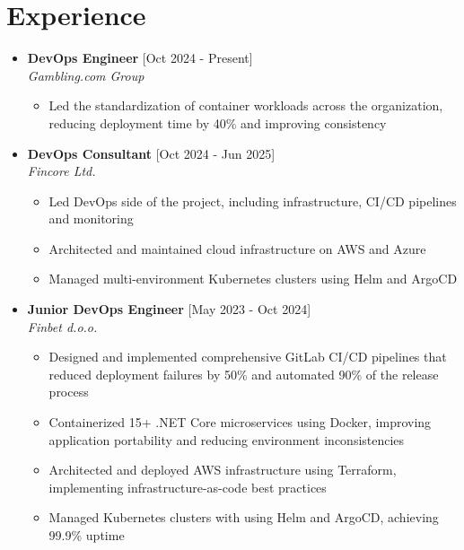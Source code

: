 \documentclass[12pt,a4paper]{moderncv}
\begin{document}
\makecvtitle

\vspace{-0.5em}
\section{Experience}

\begin{itemize}
	\item \textbf{DevOps Engineer} \hfill [Oct 2024 - Present]\\
	\textit{Gambling.com Group}

	\begin{itemize}
		\vspace{-0.75em}
		\setlength\itemsep{0.1em}
		\item Led the standardization of container workloads across the organization, reducing deployment time by 40\% and improving consistency
	\end{itemize}

	\item \textbf{DevOps Consultant} \hfill [Oct 2024 - Jun 2025]\\
	\textit{Fincore Ltd.}

	\begin{itemize}
		\vspace{-0.75em}
		\setlength\itemsep{0.1em}
		\item Led DevOps side of the project, including infrastructure, CI/CD pipelines and monitoring
		\item Architected and maintained cloud infrastructure on AWS and Azure
		\item Managed multi-environment Kubernetes clusters using Helm and ArgoCD
	\end{itemize}

	\item \textbf{Junior DevOps Engineer} \hfill [May 2023 - Oct 2024]\\
	\textit{Finbet d.o.o.}

	\begin{itemize}
		\vspace{-0.75em}
		\setlength\itemsep{0.1em}
		\item Designed and implemented comprehensive GitLab CI/CD pipelines that reduced deployment failures by 50\% and automated 90\% of the release process
		\item Containerized 15+ .NET Core microservices using Docker, improving application portability and reducing environment inconsistencies
		\item Architected and deployed AWS infrastructure using Terraform, implementing infrastructure-as-code best practices
		\item Managed Kubernetes clusters with using Helm and ArgoCD, achieving 99.9\% uptime
	\end{itemize}

\end{itemize}	
\end{document}
